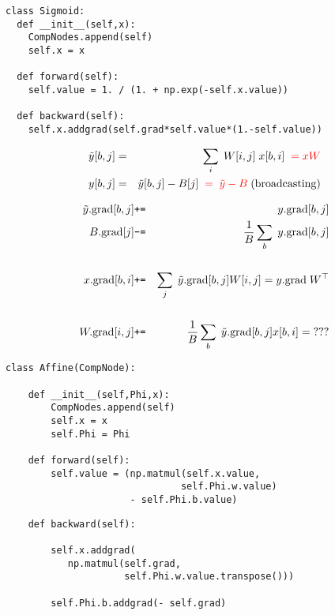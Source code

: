 {\begin{verbatim}
class Sigmoid:
  def __init__(self,x):
    CompNodes.append(self)
    self.x = x

  def forward(self):
    self.value = 1. / (1. + np.exp(-self.x.value))

  def backward(self):
    self.x.addgrad(self.grad*self.value*(1.-self.value))
\end{verbatim}


\vspace{-3ex}
\begin{eqnarray*}
  \tilde{y}[b,j] & = & \sum_i\;W[i,j]\;x[b,i] {\color{red}\;\; = xW}  \\
  y[b,j] & = & \tilde{y}[b,j] - B[j] {\color{red} \;\;=\;\tilde{y} - B}\; \mathrm{(broadcasting)}
  \end{eqnarray*}

\vspace{-2ex}
{\color{red}
\begin{eqnarray*}
  \tilde{y}.\mathrm{grad}[b,j] &\mbox{\tt +=} & y.\mathrm{grad}[b,j] \\
  B.\mathrm{grad}[j] & \mbox{\tt -=} & \frac{1}{B} \sum_b\;y.\mathrm{grad}[b,j] \\
  \\
  x.\mathrm{grad}[b,i] & \mbox{\tt +=} & \sum_j\;\tilde{y}.\mathrm{grad}[b,j]W[i,j] = y.\mathrm{grad}\;W^\top\\
  \\
  W.\mathrm{grad}[i,j] & \mbox{\tt +=} & \frac{1}{B} \sum_b\;\tilde{y}.\mathrm{grad}[b,j]x[b,i] =\; ???
\end{eqnarray*}
}

\slide{}

\begin{verbatim}
class Affine(CompNode):

    def __init__(self,Phi,x):
        CompNodes.append(self)
        self.x = x
        self.Phi = Phi

    def forward(self):
        self.value = (np.matmul(self.x.value,
                               self.Phi.w.value)
                      - self.Phi.b.value)
\end{verbatim}

\slide{}

\begin{verbatim}
    def backward(self):

        self.x.addgrad(
           np.matmul(self.grad,
                     self.Phi.w.value.transpose()))

        self.Phi.b.addgrad(- self.grad)


\end{verbatim}}
